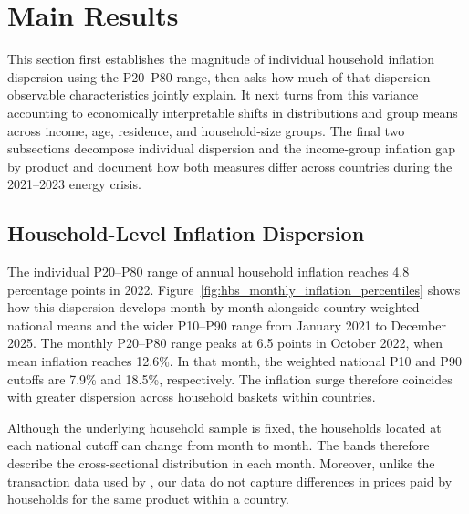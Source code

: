 \documentclass[11pt]{article}
\begin{document}
\section{Main Results}
\label{sec:main-results}

This section first establishes the magnitude of individual household inflation dispersion using the
P20--P80 range, then asks how much of that dispersion observable characteristics jointly explain.
It next turns from this variance accounting to economically interpretable shifts in distributions and
group means across income, age, residence, and household-size groups. The final two subsections
decompose individual dispersion and the income-group inflation gap by product and document how both
measures differ across countries during the 2021--2023 energy crisis.


\subsection{Household-Level Inflation Dispersion}





The individual P20--P80 range of annual household inflation reaches 4.8 percentage points in 2022.
Figure~\ref{fig:hbs_monthly_inflation_percentiles} shows how this dispersion develops month by month
alongside country-weighted national means and the wider P10--P90 range from January 2021 to December
2025. The monthly P20--P80 range peaks at 6.5 points in October 2022, when mean inflation reaches
12.6\%. In that month, the weighted national P10 and P90 cutoffs are 7.9\% and 18.5\%, respectively.
The inflation surge therefore coincides with greater dispersion across household baskets within
countries.

Although the underlying household sample is fixed, the households located at each national cutoff can change from month to month. The bands therefore describe the cross-sectional distribution in each month. Moreover, unlike the transaction data used by \citet{kaplan2017inflation}, our data do not capture differences in prices paid by households for the same product within a country.
\end{document}
